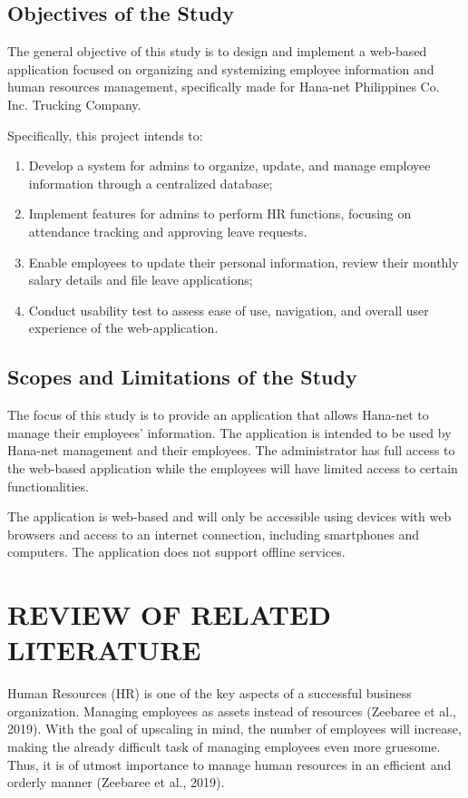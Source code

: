 \documentclass[journal]{./IEEE/IEEEtran}
\begin{document}
\subsection{\textbf{Objectives of the Study}}
The general objective of this study is to design and implement a web-based application focused on organizing and systemizing employee information and human resources management, specifically made for Hana-net Philippines Co. Inc. Trucking Company.

Specifically, this project intends to:
\begin{enumerate}
    \item Develop a system for admins to organize, update, and manage employee information through a centralized database;
    \item Implement features for admins to perform HR functions, focusing on attendance tracking and approving leave requests.
    \item Enable employees to update their personal information, review their monthly salary details and file leave applications;
    \item Conduct usability test to assess ease of use, navigation, and overall user experience of the web-application.
\end{enumerate}


\subsection{\textbf{Scopes and Limitations of the Study}}
The focus of this study is to provide an application that allows Hana-net to manage their employees’ information. The application is intended to be used by Hana-net management and their employees. The administrator has full access to the web-based application while the employees will have limited access to certain functionalities. 

The application is web-based and will only be accessible using devices with web browsers and access to an internet connection, including smartphones and computers. The application does not support offline services.

\section{\textbf{REVIEW OF RELATED LITERATURE}}
Human Resources (HR) is one of the key aspects of a successful business organization. Managing employees as assets instead of resources (Zeebaree et al., 2019). With the goal of upscaling in mind, the number of employees will increase, making the already difficult task of managing employees even more gruesome. Thus, it is of utmost importance to manage human resources in an efficient and orderly manner (Zeebaree et al., 2019).   
\end{document}
